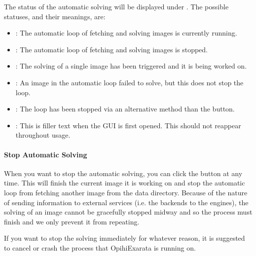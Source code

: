 \documentclass[letterpaper,11pt,english]{sphinxmanual}
\begin{document}
\sphinxAtStartPar
The status of the automatic solving will be displayed under
. The possible statuses, and their meanings, are:
\begin{itemize}
\item {} 
\sphinxAtStartPar
{}: The automatic loop of fetching and solving images is currently running.

\item {} 
\sphinxAtStartPar
{}: The automatic loop of fetching and solving images is stopped.

\item {} 
\sphinxAtStartPar
{}: The solving of a single image has been triggered and it is being worked on.

\item {} 
\sphinxAtStartPar
{}: An image in the automatic loop failed to solve, but this does not stop the loop.

\item {} 
\sphinxAtStartPar
{}: The loop has been stopped via an alternative method than the  button.

\item {} 
\sphinxAtStartPar
{}: This is filler text when the GUI is first opened. This should not reappear throughout usage.

\end{itemize}


\paragraph{Stop Automatic Solving}
\label{\detokenize{user/automatic_mode:stop-automatic-solving}}
\sphinxAtStartPar
When you want to stop the automatic solving, you can click the  button
at any time. This will finish the current image it is working on and stop the
automatic loop from fetching another image from the data directory. Because of
the nature of sending information to external services (i.e. the backends to the
engines), the solving of an image cannot be gracefully stopped mid\sphinxhyphen{}way and so
the process must finish and we only prevent it from repeating.

\sphinxAtStartPar
If you want to stop the solving immediately for whatever reason, it is
suggested to cancel or crash the process that OpihiExarata is running on.
\end{document}

